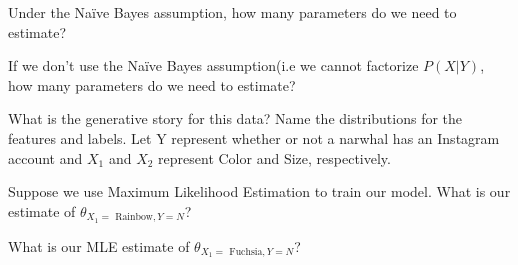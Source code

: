\documentclass[11pt,addpoints,answers]{exam}
\begin{document}
\begin{questions}
\begin{parts}
\begin{subparts}

    \subpart[1] Under the Naïve Bayes assumption, how many parameters do we need to estimate? \\
    \begin{your_solution}[width=4cm,height=2cm]

    \end{your_solution}


    \subpart[1] If we don't use the Naïve Bayes assumption(i.e we cannot factorize $P(X|Y)$, how many parameters do we need to estimate? \\
    \begin{your_solution}[width=4cm,height=2cm]

    \end{your_solution}


    \subpart[3] What is the generative story for this data? Name the distributions for the features and labels. Let Y represent whether or not a narwhal has an Instagram account and $X_1$ and $X_2$ represent Color and Size, respectively.

    \begin{your_solution}[width=4cm,height=2cm, title=Y]
    \end{your_solution}
    \begin{your_solution}[width=4cm,height=2cm, title = $X_1|Y$]
    \end{your_solution}
    \begin{your_solution}[width=4cm,height=2cm, title = $X_2|Y$]
    \end{your_solution}


    \subpart[1] Suppose we use Maximum Likelihood Estimation to train our model. What is our estimate of $\theta_{X_1 = \text{ Rainbow}, Y = N}$? \\
    \begin{your_solution}[width=4cm,height=2cm]

    \end{your_solution}


    \newpage
    
    \subpart[1] What is our MLE estimate of $\theta_{X_1 = \text{ Fuchsia}, Y = N}$? \\
    \begin{your_solution}[width=4cm,height=2cm]

    \end{your_solution}


\end{subparts}
\end{parts}
\end{questions}
\end{document}

